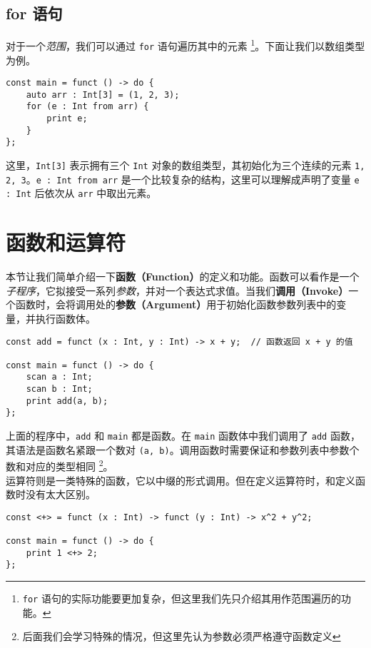 \subsection{for 语句}

对于一个\emph{范围}，我们可以通过 \lstinline!for! 语句遍历其中的元素 \footnote{\lstinline!for! 语句的实际功能要更加复杂，但这里我们先只介绍其用作范围遍历的功能。}。下面让我们以数组类型为例。

\begin{lstlisting}
const main = funct () -> do {
    auto arr : Int[3] = (1, 2, 3);
    for (e : Int from arr) {
        print e;
    }
};
\end{lstlisting}

这里，\lstinline!Int[3]! 表示拥有三个 \lstinline!Int! 对象的数组类型，其初始化为三个连续的元素 \lstinline!1, 2, 3!。\lstinline!e : Int from arr! 是一个比较复杂的结构，这里可以理解成声明了变量 \lstinline!e : Int! 后依次从 \lstinline!arr! 中取出元素。


\section{函数和运算符}

本节让我们简单介绍一下\textbf{函数（Function）}的定义和功能。函数可以看作是一个\emph{子程序}，它拟接受一系列\emph{参数}，并对一个表达式求值。当我们\textbf{调用（Invoke）}一个函数时，会将调用处的\textbf{参数（Argument）}用于初始化函数参数列表中的变量，并执行函数体。

\begin{lstlisting}
const add = funct (x : Int, y : Int) -> x + y;	// 函数返回 x + y 的值

const main = funct () -> do {
    scan a : Int;
    scan b : Int;
    print add(a, b);
};
\end{lstlisting}

上面的程序中，\lstinline!add! 和 \lstinline!main! 都是函数。在 \lstinline!main! 函数体中我们调用了 \lstinline!add! 函数，其语法是函数名紧跟一个数对 \lstinline!(a, b)!。调用函数时需要保证和参数列表中参数个数和对应的类型相同 \footnote{后面我们会学习特殊的情况，但这里先认为参数必须严格遵守函数定义}。 \\

运算符则是一类特殊的函数，它以中缀的形式调用。但在定义运算符时，和定义函数时没有太大区别。

\begin{lstlisting}
const <+> = funct (x : Int) -> funct (y : Int) -> x^2 + y^2;

const main = funct () -> do {
    print 1 <+> 2;
};
\end{lstlisting}

